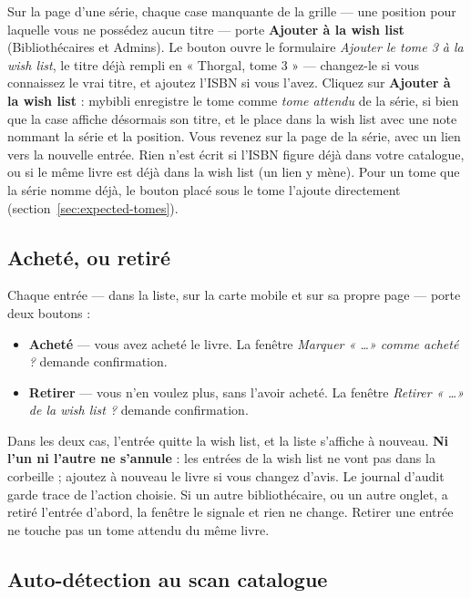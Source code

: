 Sur la page d'une série, chaque case manquante de la grille --- une
position pour laquelle vous ne possédez aucun titre --- porte
\textbf{Ajouter à la wish list} (Bibliothécaires et Admins). Le bouton
ouvre le formulaire \emph{Ajouter le tome 3 à la wish list}, le titre
déjà rempli en « Thorgal, tome 3 » --- changez-le si vous connaissez le
vrai titre, et ajoutez l'ISBN si vous l'avez. Cliquez sur
\textbf{Ajouter à la wish list} : mybibli enregistre le tome comme
\emph{tome attendu} de la série, si bien que la case affiche désormais
son titre, et le place dans la wish list avec une note nommant la série
et la position. Vous revenez sur la page de la série, avec un lien vers
la nouvelle entrée. Rien n'est écrit si l'ISBN figure déjà dans votre
catalogue, ou si le même livre est déjà dans la wish list (un lien y
mène). Pour un tome que la série nomme déjà, le bouton placé sous le
tome l'ajoute directement (section~\ref{sec:expected-tomes}).

\subsection{Acheté, ou retiré}

Chaque entrée --- dans la liste, sur la carte mobile et sur sa propre
page --- porte deux boutons :

\begin{itemize}
  \item \textbf{Acheté} --- vous avez acheté le livre. La fenêtre
        \emph{Marquer « \dots » comme acheté ?} demande confirmation.
  \item \textbf{Retirer} --- vous n'en voulez plus, sans l'avoir
        acheté. La fenêtre \emph{Retirer « \dots » de la wish list ?}
        demande confirmation.
\end{itemize}

Dans les deux cas, l'entrée quitte la wish list, et la liste s'affiche
à nouveau. \textbf{Ni l'un ni l'autre ne s'annule} : les entrées de la
wish list ne vont pas dans la corbeille ; ajoutez à nouveau le livre si
vous changez d'avis. Le journal d'audit garde trace de l'action choisie.
Si un autre bibliothécaire, ou un autre onglet, a retiré l'entrée
d'abord, la fenêtre le signale et rien ne change. Retirer une entrée ne
touche pas un tome attendu du même livre.

\subsection{Auto-détection au scan catalogue}

